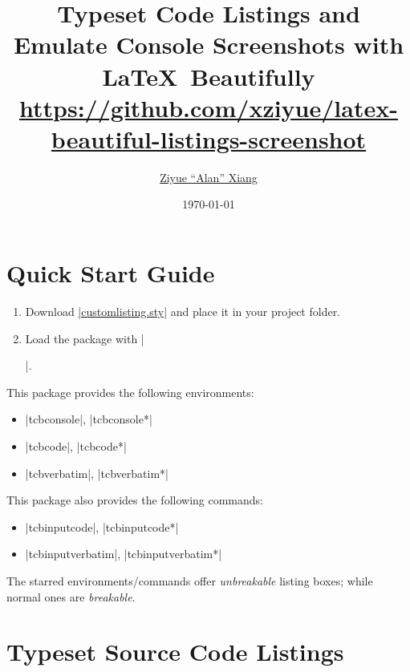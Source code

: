 \documentclass[letterpaper, 11pt, DIV=11]{scrartcl}
\author{\href{https://www.alanshawn.com}{Ziyue ``Alan'' Xiang}}
\title{Typeset Code Listings and Emulate Console Screenshots with \LaTeX\  Beautifully\\ {\small \url{https://github.com/xziyue/latex-beautiful-listings-screenshot}}}
\date{\today}
\begin{document}

\maketitle

\tableofcontents

\clearpage



\section{Quick Start Guide}

\begin{enumerate}
\item Download \href{https://github.com/xziyue/latex-beautiful-listings-screenshot/blob/master/customlisting.sty}{\rawinline|customlisting.sty|} and place it in your project folder.
\item Load the package with \texinline|\usepackage{customlisting}|.
\end{enumerate}

This package provides the following environments:
\begin{itemize}
\item \rawinline|tcbconsole|, \rawinline|tcbconsole*|
\item \rawinline|tcbcode|, \rawinline|tcbcode*|
\item \rawinline|tcbverbatim|, \rawinline|tcbverbatim*|
\end{itemize}

This package also provides the following commands:
\begin{itemize}
\item \rawinline|tcbinputcode|, \rawinline|tcbinputcode*|
\item \rawinline|tcbinputverbatim|, \rawinline|tcbinputverbatim*|
\end{itemize}

The starred environments/commands offer \emph{unbreakable} listing boxes; while normal ones are \emph{breakable}.



\section{Typeset Source Code Listings}
\end{document}
